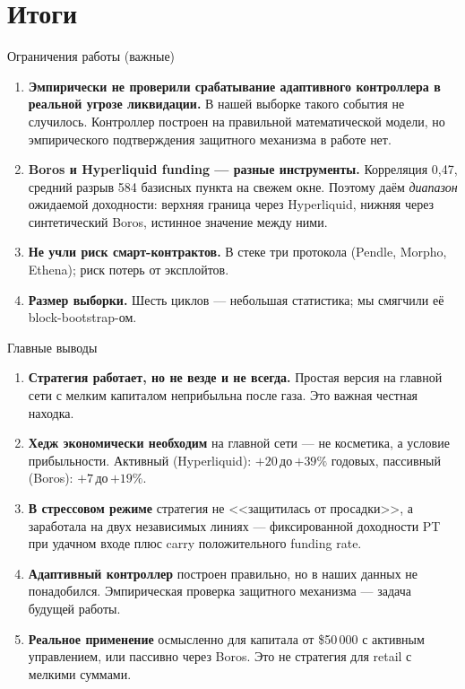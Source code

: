 \documentclass[11pt,aspectratio=169]{beamer}
\begin{document}
\section{Итоги}

\begin{frame}{Ограничения работы (важные)}
  \begin{enumerate}\itemsep0.3em
    \item \textbf{Эмпирически не проверили срабатывание адаптивного
          контроллера в реальной угрозе ликвидации.} В нашей выборке
          такого события не случилось. Контроллер построен на правильной
          математической модели, но эмпирического подтверждения
          защитного механизма в работе нет.
    \item \textbf{Boros и Hyperliquid funding --- разные инструменты.}
          Корреляция 0{,}47, средний разрыв 584 базисных пункта на
          свежем окне. Поэтому даём \emph{диапазон} ожидаемой
          доходности: верхняя граница через Hyperliquid, нижняя через
          синтетический Boros, истинное значение между ними.
    \item \textbf{Не учли риск смарт-контрактов.} В стеке три протокола
          (Pendle, Morpho, Ethena); риск потерь от
          эксплойтов.
    \item \textbf{Размер выборки.} Шесть циклов --- небольшая статистика;
          мы смягчили её block-bootstrap-ом.
  \end{enumerate}
\end{frame}

\begin{frame}{Главные выводы}
  \footnotesize
  \begin{enumerate}\itemsep0.3em
    \item \textbf{Стратегия работает, но не везде и не всегда.}
          Простая версия на главной сети с мелким капиталом
          неприбыльна после газа. Это важная честная находка.

    \item \textbf{Хедж экономически необходим} на главной сети ---
          не косметика, а условие прибыльности. Активный (Hyperliquid):
          $+20$\,до\,$+39\%$ годовых, пассивный (Boros): $+7$\,до\,$+19\%$.

    \item \textbf{В стрессовом режиме} стратегия не <<защитилась от
          просадки>>, а заработала на двух независимых линиях ---
          фиксированной доходности PT при удачном входе плюс carry
          положительного funding rate.

    \item \textbf{Адаптивный контроллер} построен правильно, но в наших
          данных не понадобился. Эмпирическая проверка защитного
          механизма --- задача будущей работы.

    \item \textbf{Реальное применение} осмысленно для капитала
          от \$50\,000 с активным управлением, или пассивно через
          Boros. Это не стратегия для retail с мелкими суммами.
  \end{enumerate}
\end{frame}
\end{document}
